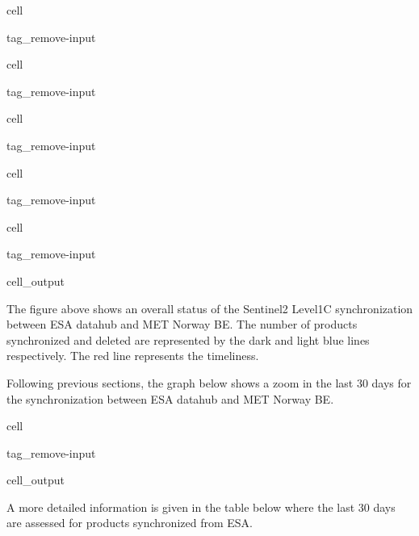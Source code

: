 \documentclass[letterpaper,10pt,english]{jupyterBook}
\begin{document}
\begin{sphinxuseclass}{cell}
\begin{sphinxuseclass}{tag_remove-input}
\end{sphinxuseclass}
\end{sphinxuseclass}
\begin{sphinxuseclass}{cell}
\begin{sphinxuseclass}{tag_remove-input}
\end{sphinxuseclass}
\end{sphinxuseclass}
\begin{sphinxuseclass}{cell}
\begin{sphinxuseclass}{tag_remove-input}
\end{sphinxuseclass}
\end{sphinxuseclass}
\begin{sphinxuseclass}{cell}
\begin{sphinxuseclass}{tag_remove-input}
\end{sphinxuseclass}
\end{sphinxuseclass}
\begin{sphinxuseclass}{cell}
\begin{sphinxuseclass}{tag_remove-input}\begin{sphinxVerbatimOutput}

\begin{sphinxuseclass}{cell_output}
\noindent{}

\end{sphinxuseclass}\end{sphinxVerbatimOutput}

\end{sphinxuseclass}
\end{sphinxuseclass}
\sphinxAtStartPar
The figure above shows an overall status of the Sentinel\sphinxhyphen{}2 Level\sphinxhyphen{}1C synchronization between ESA datahub and MET Norway BE. The number of products synchronized and deleted are represented by the dark and light blue lines respectively. The red line represents the timeliness.

\sphinxAtStartPar
Following previous sections, the graph below shows a zoom in the last 30 days for the synchronization between ESA datahub and MET Norway BE.

\begin{sphinxuseclass}{cell}
\begin{sphinxuseclass}{tag_remove-input}\begin{sphinxVerbatimOutput}

\begin{sphinxuseclass}{cell_output}
\noindent{}

\end{sphinxuseclass}\end{sphinxVerbatimOutput}

\end{sphinxuseclass}
\end{sphinxuseclass}
\sphinxAtStartPar
A more detailed information is given in the table below where the last 30 days are assessed for products synchronized from ESA.
\end{document}
